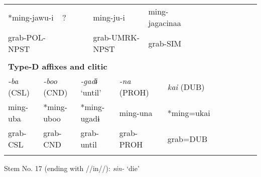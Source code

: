 \begin{tabularx}{\textwidth}{XXXXXXXXXXXXXXXXXXXXXXX}
\multicolumn{4}{X}{{ *ming-jawu-i}} & \multicolumn{3}{X}{{ ?}} & \multicolumn{4}{X}{ming-ju-i} & \multicolumn{4}{X}{{ ming-jagacinaa}} & \multicolumn{8}{X}{}\\
\multicolumn{4}{X}{grab-POL-NPST} & \multicolumn{3}{X}{} & \multicolumn{4}{X}{grab-UMRK-NPST} & \multicolumn{4}{X}{grab-SIM} & \multicolumn{8}{X}{}\\
\multicolumn{23}{X}{}\\
\multicolumn{23}{X}{{\bfseries Type-D affixes and clitic}}\\
\multicolumn{2}{X}{{ \textit{{}-ba} (CSL)}} & \multicolumn{4}{X}{{ \textit{{}-boo} (CND)}} & \multicolumn{3}{X}{{ \textit{{}-gadɨ} ‘until’}} & \multicolumn{3}{X}{{ \textit{{}-na} (PROH)}} & \multicolumn{6}{X}{{ \textit{kai} (DUB)}} & \multicolumn{5}{X}{}\\
\multicolumn{2}{X}{{ ming-uba}} & \multicolumn{4}{X}{{ *ming-uboo}} & \multicolumn{3}{X}{{ *ming-ugadɨ}} & \multicolumn{3}{X}{{ ming-una}} & \multicolumn{6}{X}{{ *ming=ukai}} & \multicolumn{5}{X}{}\\
\multicolumn{2}{X}{grab-CSL} & \multicolumn{4}{X}{grab-CND} & \multicolumn{3}{X}{grab-until} & \multicolumn{3}{X}{grab-PROH} & \multicolumn{6}{X}{grab=DUB} & \multicolumn{5}{X}{}\\
\lspbottomrule
\end{tabularx}
Stem No. 17 (ending with //in//): \textit{sin-} ‘die’

\tablefirsthead{}

